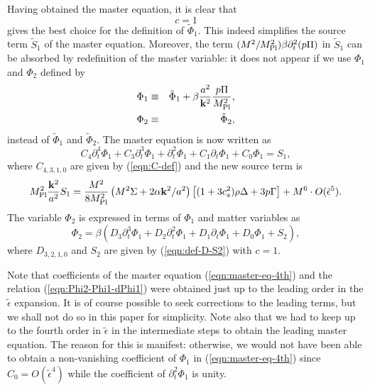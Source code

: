 Having obtained the master equation, it is clear that 
%
\begin{equation}
 c = 1
\end{equation}
gives the best choice for the definition of $\tilde{\Phi}_1$. This
indeed simplifies the source term $\tilde{S}_1$ of the master
equation. Moreover, the term $(M^2/M_{\rm Pl}^2)\beta\partial_t^2(p\Pi)$
in $\tilde{S}_1$ can be absorbed by redefinition of the master variable:
it does not appear if we use $\Phi_1$ and $\Phi_2$ defined by 
%
\begin{eqnarray}
 \Phi_1 & \equiv & \tilde{\Phi}_1 
  + \beta \frac{a^2}{{\bf k}^2}\frac{p\Pi}{M_{\rm Pl}^2}, \nonumber\\
 \Phi_2 & \equiv & \tilde{\Phi}_2,
\end{eqnarray}
instead of $\tilde{\Phi}_1$ and $\tilde{\Phi}_2$. The master equation is
now written as
%
\begin{equation}
 C_4\partial_t^4\Phi_1 + C_3\partial_t^3\Phi_1 +
  \partial_t^2\Phi_1 + C_1\partial_t\Phi_1 + C_0\Phi_1 = S_1,
  \label{eqn:master-eq-4th}
\end{equation}
where $C_{4,3,1,0}$ are given by (\ref{eqn:C-def}) and the new source
term is 
%
\begin{equation}
 M_{\rm Pl}^2\frac{{\bf k}^2}{a^2}S_1 = 
  \frac{M^2}{8M_{\rm Pl}^2}
  \left( M^2\Sigma+2\alpha{\bf k}^2/a^2\right)
  \left[(1+3c_s^2)\rho\Delta+3p\Gamma\right] 
  + M^6\cdot O(\tilde{\epsilon}^5).
  \label{eqn:S1-def}
\end{equation}
The variable $\Phi_2$ is expressed in terms of $\Phi_1$ and matter
variables as
%
\begin{equation}
 \Phi_2 = \beta\left(D_3\partial_t^3\Phi_1 
  + D_2\partial_t^2\Phi_1 + D_1\partial_t\Phi_1 +
  D_0\Phi_1 + S_2\right),
 \label{eqn:Phi2-Phi1-dPhi1}
\end{equation}
where $D_{3,2,1,0}$ and $S_2$ are given by (\ref{eqn:def-D-S2}) with $c=1$. 


Note that coefficients of the master equation (\ref{eqn:master-eq-4th})
and the relation (\ref{eqn:Phi2-Phi1-dPhi1}) were obtained just up to
the leading order in the $\tilde{\epsilon}$ expansion. It is of course 
possible to seek corrections to the leading terms, but we shall not do
so in this paper for simplicity. Note also that we had to keep up to the 
fourth order in $\tilde{\epsilon}$ in the intermediate steps to obtain
the leading master equation. The reason for this is manifest: otherwise,
we would not have been able to obtain a non-vanishing coefficient of 
$\Phi_1$ in (\ref{eqn:master-eq-4th}) since $C_0=O(\tilde{\epsilon}^4)$
while the coefficient of $\partial_t^2\Phi_1$ is unity. 







